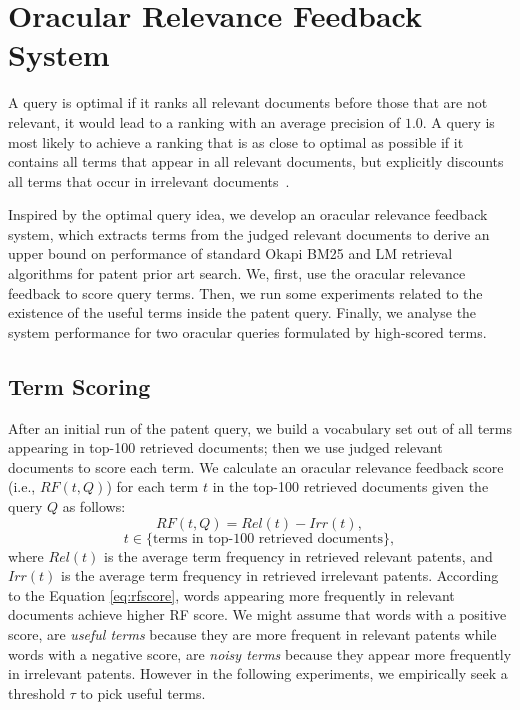 \section{Oracular Relevance Feedback System}
\label{sec:oraculrquery}
A query is optimal if it ranks all relevant documents before
those that are not relevant, it would lead to a ranking with an average precision of $1.0$. A query
is most likely to achieve a ranking that is as close to optimal as possible if it contains all terms that
appear in all relevant documents, but explicitly discounts all terms that occur in irrelevant documents~\citep{manning2008introduction}.

Inspired by the optimal query idea, we develop an oracular relevance feedback system, which
extracts terms from the judged relevant documents to derive an upper bound on performance of
standard Okapi BM25 and LM retrieval
algorithms for patent prior art search.
We, first, use the oracular relevance feedback to score query terms. 
Then, we run some experiments related to the existence of the useful terms inside the patent query.   
Finally, we analyse the system performance for two oracular queries formulated by high-scored terms. 
\subsection{Term Scoring}
\label{OracularTermSelection}
After an initial run of the patent query, we build a vocabulary set out of all terms appearing in top-100 retrieved documents; 
then we use judged relevant documents to score each term. 
We calculate an oracular relevance feedback score (i.e., $RF(t,Q)$) for each term $t$ in the top-100
retrieved documents given the query $Q$ as follows:
\begin{equation}
RF(t,Q)=Rel(t)-Irr(t), 
 \label{eq:rfscore}
\end{equation}
\begin{displaymath}t\in \lbrace \mbox{terms in top-100 retrieved documents}\rbrace,\end{displaymath}
where $ \mathit{Rel(t)} $ is the average term frequency in retrieved relevant patents, and $ \mathit{Irr(t)} $ is the average term frequency in retrieved irrelevant patents. According to the Equation \ref{eq:rfscore}, words appearing more frequently in relevant documents achieve higher RF score. We might assume that words with a positive score, are \textit{useful terms} because they are more frequent in relevant patents while words with a negative score, are \textit{noisy terms} because they appear more frequently in irrelevant patents. However in the following experiments, we empirically seek a threshold $\tau$ to pick useful terms. 

